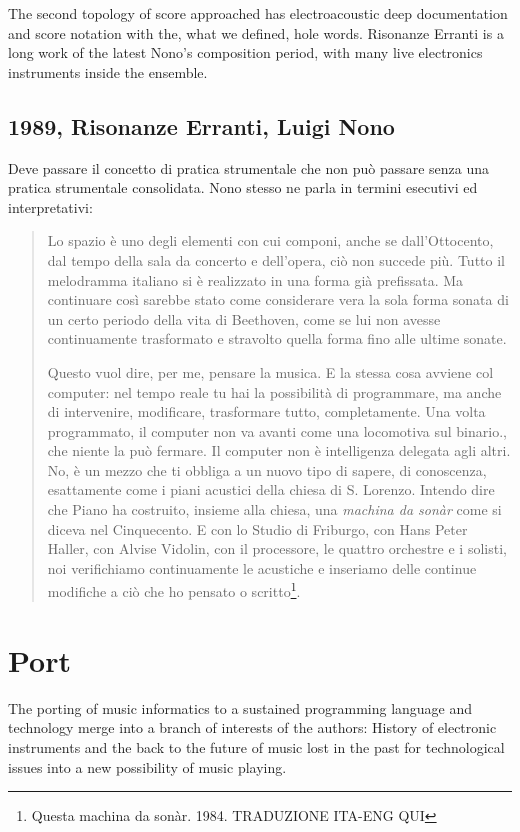 \documentclass[twoside,a4paper]{article}
\begin{document}
The second topology of score approached has electroacoustic deep documentation and score notation with the, what we defined, hole words. Risonanze Erranti is a long work of the latest Nono's composition period, with many live electronics instruments inside the ensemble. 

\subsection{1989, Risonanze Erranti, Luigi Nono}

Deve passare il concetto di pratica strumentale che non può passare senza una pratica strumentale consolidata. Nono stesso ne parla in termini esecutivi ed interpretativi:

\begin{quote}
Lo spazio è uno degli elementi con cui componi, anche se dall'Ottocento, dal tempo della sala da concerto e dell'opera, ciò non succede più. 
Tutto il melodramma italiano si è realizzato in una forma già prefissata. Ma continuare così sarebbe stato come considerare vera la sola forma sonata di un certo periodo della vita di Beethoven, come se lui non avesse continuamente trasformato e stravolto quella forma fino alle ultime sonate. 

Questo vuol dire, per me, pensare la musica. E la stessa cosa avviene col computer: nel tempo reale tu hai la possibilità di programmare, ma anche di intervenire, modificare, trasformare tutto, completamente. Una volta programmato, il computer non va avanti come una locomotiva sul binario., che niente la può fermare. Il computer non è intelligenza delegata agli altri. No, è un mezzo che ti obbliga a un nuovo tipo di sapere, di conoscenza, esattamente come i piani acustici della chiesa di S. Lorenzo. Intendo dire che Piano ha costruito, insieme alla chiesa, una \emph{machina da sonàr} come si diceva nel Cinquecento. E con lo Studio di Friburgo, con Hans Peter Haller, con Alvise Vidolin, con il processore, le quattro orchestre e i solisti, noi verifichiamo continuamente le acustiche e inseriamo delle continue modifiche a ciò che ho pensato o scritto\footnote{Questa machina da sonàr. 1984. TRADUZIONE ITA-ENG QUI}. 
\end{quote}

\section{Port}
\label{sec:porting}

The porting of music informatics to a sustained programming language and technology merge into a branch of interests of the authors: History of electronic instruments and the back to the future of music lost in the past for technological issues into a new possibility of music playing. 
\end{document}

